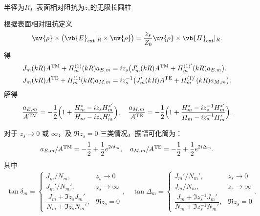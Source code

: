 \begin{exbox}
	半径为\(R\)，表面相对阻抗为\(z_s\)的无限长圆柱

	根据表面相对阻抗定义
	\begin{align*}
		\uv{\rho}\times\bigl(\vb{E}_{\rm ext}|_R\times\uv{\rho}\bigr) = \frac{z_s}{Z_0}\uv{\rho}\times\vb{H}_{\rm ext}|_R.
	\end{align*}
	得
	\begin{align*}
		J_m(kR)A^{\rm TM} + H_m^{(1)}(kR)a_{E,m} &= iz_s\bigl(J_m'(kR)A^{\rm TM} + H_m^{(1)'}(kR)a_{E,m}\bigr).\\
		J_m(kR)A^{\rm TE} + H_m^{(1)}(kR)a_{M,m} &= iz_s^{-1}\bigl(J_m'(kR)A^{\rm TE} + H_m^{(1)'}(kR)a_{M,m}\bigr).
	\end{align*}
	解得
	\begin{align*}
		\frac{a_{E,m}}{A^{\rm TM}} = -\frac{1}{2}\Bigl(1 + \frac{H_m^{*}-iz_sH_m^{*'}}{H_m-iz_sH_m'}\Bigr),\quad \frac{a_{M,m}}{A^{\rm TE}} = -\frac{1}{2}\Bigl(1 + \frac{H_m^{*}-iz_s^{-1}H_m^{*'}}{H_m-iz_s^{-1}H_m'}\Bigr).
	\end{align*}

	对于 \(z_s\to0\) 或 \(\infty\)，及 \(\Re z_s = 0\) 三类情况，振幅可化简为：
	\begin{align*}
		a_{E,m}/A^{\rm TM} = -\frac{1}{2}+\frac{1}{2}e^{2i\delta_m},\quad a_{M,m}/A^{\rm TE} = -\frac{1}{2}+\frac{1}{2}e^{2i\Delta_m}.
	\end{align*}
	其中
	\begin{align*}
		\tan\delta_m=
		\begin{cases}
			J_m/N_m,                                  & z_s\to0      \\
			J_m'/N_m',                                & z_s\to\infty \\
			\dfrac{J_m+\Im z_sJ_m'}{N_m+\Im z_sN_m'}, & \Re z_s=0
		\end{cases},
		\quad\tan\Delta_m=
		\begin{cases}
			J_m'/N_m',                                          & z_s\to0      \\
			J_m/N_m,                                            & z_s\to\infty \\
			\dfrac{J_m+\Im z_s^{-1}J_m'}{N_m+\Im z_s^{-1}N_m'}, & \Re z_s=0
		\end{cases}.
	\end{align*}


\end{exbox}
